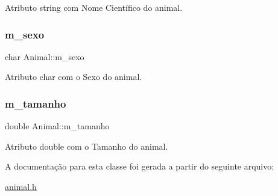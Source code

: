 Atributo string com Nome Científico do animal. \mbox{\label{classAnimal_aaa6d77e661ed0fa9a33500588c8acfef}} 
\subsubsection{\texorpdfstring{m\+\_\+sexo}{m\_sexo}}
{\footnotesize\ttfamily char Animal\+::m\+\_\+sexo\hspace{0.3cm}{\ttfamily [protected]}}

Atributo char com o Sexo do animal. \mbox{\label{classAnimal_afe83ba40e79b42d06b0c95f61aaa0218}} 
\subsubsection{\texorpdfstring{m\+\_\+tamanho}{m\_tamanho}}
{\footnotesize\ttfamily double Animal\+::m\+\_\+tamanho\hspace{0.3cm}{\ttfamily [protected]}}

Atributo double com o Tamanho do animal. 

A documentação para esta classe foi gerada a partir do seguinte arquivo\+:\begin{DoxyCompactItemize}
\item 
\hyperlink{animal_8h}{animal.\+h}\end{DoxyCompactItemize}
